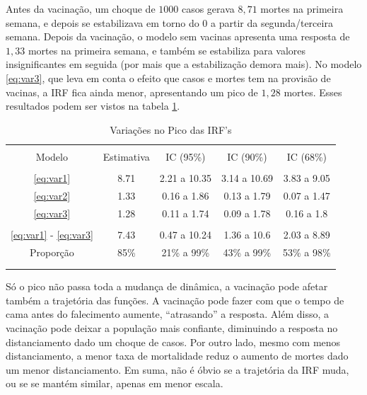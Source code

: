 \documentclass[
	12pt,				%
	oneside,			%
	a4paper,			%
	english,			%
	brazil				%
	hyperref = {colorlinks, citecolor=c1d, linkcolor=c2d, urlcolor=c3d, colorlinks}
	]{abntex2}
\newcounter{j}
\begin{document}
Antes da vacinação, um choque de $1000$ casos gerava $8,71$ mortes na primeira semana, e depois se estabilizava em torno do 0 a partir da segunda/terceira semana. Depois da vacinação, o modelo sem vacinas apresenta uma resposta de $1,33$ mortes na primeira semana, e também se estabiliza para valores insignificantes em seguida (por mais que a estabilização demora mais). No modelo \eqref{eq:var3}, que leva em conta o efeito que casos e mortes tem na provisão de vacinas, a IRF fica ainda menor, apresentando um pico de $1,28$ mortes. Esses resultados podem ser vistos na tabela \ref{tb:irfpico}.

\begin{table}[H]
\centering
\caption{Variações no Pico das IRF's}
\label{tb:irfpico}
\begin{tabular}{ccccc}
\\[-1.8ex]\hline 
\hline \\[-1.8ex] 
Modelo & Estimativa & IC (95\%) & IC (90\%) & IC (68\%) \\\hline\\[-1.8ex]
\multicolumn{1}{c|}{\eqref{eq:var1}}                   & 8.71 & 2.21 a 10.35 & 3.14 a 10.69 & 3.83 a 9.05 \\ 
\multicolumn{1}{c|}{\eqref{eq:var2}}                   & 1.33 & 0.16 a 1.86 & 0.13  a 1.79 & 0.07  a 1.47 \\ 
\multicolumn{1}{c|}{\eqref{eq:var3}}                   & 1.28 & 0.11 a 1.74 & 0.09  a 1.78 & 0.16  a 1.8 \\ 
\multicolumn{1}{c|}{}                                  &  &  &  &  \\ 
\multicolumn{1}{c|}{\eqref{eq:var1} - \eqref{eq:var3}} & 7.43 & 0.47 a 10.24 & 1.36 a 10.6 & 2.03 a 8.89 \\ 
\multicolumn{1}{c|}{Proporção}                         & 85\% & 21\% a 99\% & 43\%  a 99\% & 53\%  a 98\% \\ 
\\[-1.8ex]\hline 
\hline \\[-1.8ex] 
\end{tabular}
\end{table}

Só o pico não passa toda a mudança de dinâmica, a vacinação pode afetar também a trajetória das funções. A vacinação pode fazer com que o tempo de cama antes do falecimento aumente, ``atrasando'' a resposta. Além disso, a vacinação pode deixar a população mais confiante, diminuindo a resposta no distanciamento dado um choque de casos. Por outro lado, mesmo com menos distanciamento, a menor taxa de mortalidade reduz o aumento de mortes dado um menor distanciamento. Em suma, não é óbvio se a trajetória da IRF muda, ou se se mantém similar, apenas em menor escala.
\end{document}
